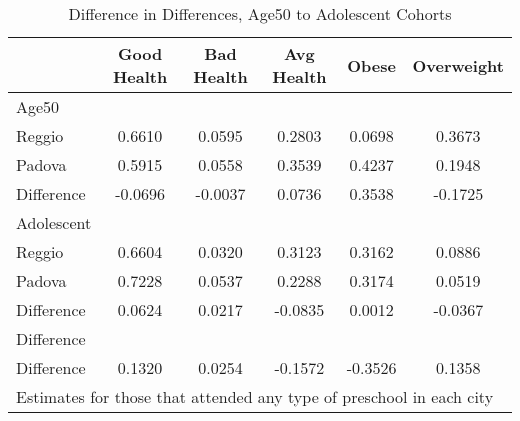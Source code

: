 \begin{table}[htbp]\centering
\caption{Difference in Differences, Age50 to Adolescent Cohorts}
\begin{tabular}{l*{5}{c}}
\hline\hline
            & Good Health&  Bad Health&  Avg Health&       Obese&  Overweight\\
\hline
Age50       &            &            &            &            &            \\
Reggio      &      0.6610&      0.0595&      0.2803&      0.0698&      0.3673\\
Padova      &      0.5915&      0.0558&      0.3539&      0.4237&      0.1948\\
Difference  &     -0.0696&     -0.0037&      0.0736&      0.3538&     -0.1725\\
\hline
Adolescent  &            &            &            &            &            \\
Reggio      &      0.6604&      0.0320&      0.3123&      0.3162&      0.0886\\
Padova      &      0.7228&      0.0537&      0.2288&      0.3174&      0.0519\\
Difference  &      0.0624&      0.0217&     -0.0835&      0.0012&     -0.0367\\
\hline
Difference  &            &            &            &            &            \\
Difference  &      0.1320&      0.0254&     -0.1572&     -0.3526&      0.1358\\
\hline\hline
\multicolumn{6}{l}{\footnotesize Estimates for those that attended any type of preschool in each city}\\
\end{tabular}
\end{table}
